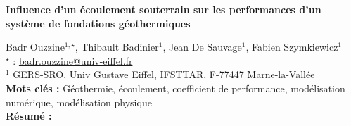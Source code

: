 


    \newpage

\BgThispage

%
\begin{flushleft}
\addtocounter{section}{1}
{\Large \textbf{Influence d'un écoulement souterrain sur les performances d'un système de fondations géothermiques}}\label{ref:46}
\end{flushleft}
%
Badr Ouzzine$^{1,\star}$, Thibault Badinier$^{1}$, Jean De Sauvage$^{1}$, Fabien Szymkiewicz$^{1}$\\[2mm]
$^{\star}$ \Letter : \url{badr.ouzzine@univ-eiffel.fr}\\[2mm]
{\footnotesize $^{1}$ GERS-SRO, Univ Gustave Eiffel, IFSTTAR, F-77447 Marne-la-Vallée}\\
[4mm]
%
\noindent \textbf{Mots clés : } Géothermie, écoulement, coefficient de performance, modélisation numérique, modélisation physique\\[4mm]
%
\noindent \textbf{Résumé : } 

